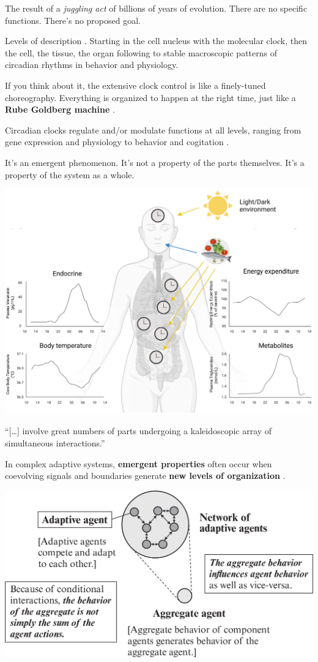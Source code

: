 \documentclass[
12pt,
openright,
oneside,
a4paper,
chapter=TITLE,
section=TITLE,
french,
spanish,
brazil,
english
]{abntex2}\usepackage{array}
\begin{document}
The result of a \emph{juggling act} of billions of years of evolution.
There are no specific functions. There's no proposed goal.

Levels of description \autocite{nicolis2012}. Starting in the cell
nucleus with the molecular clock, then the cell, the tissue, the organ
following to stable macroscopic patterns of circadian rhythms in
behavior and physiology.

If you think about it, the extensive clock control is like a
finely-tuned choreography. Everything is organized to happen at the
right time, just like a \textbf{Rube Goldberg machine}
\autocite{merrow2020}.

Circadian clocks regulate and/or modulate functions at all levels,
ranging from gene expression and physiology to behavior and cogitation
\autocite{roenneberg2007}.

It's an emergent phenomenon. It's not a property of the parts
themselves. It's a property of the system as a whole.

\includegraphics{qmd/images/flanagan-2021-figure-2.png}

``{[}\ldots{]} involve great numbers of parts undergoing a kaleidoscopic
array of simultaneous interactions.'' \autocite{holland1992b}

In complex adaptive systems, \textbf{emergent properties} often occur
when coevolving signals and boundaries generate \textbf{new levels of
organization} \autocite{holland2012}.

\includegraphics{qmd/images/holland-2012-figure-1.png}
\end{document}
